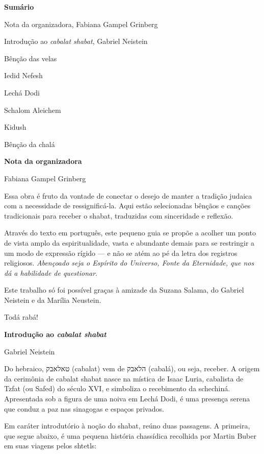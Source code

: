 \textbf{Sumário}

Nota da organizadora, Fabiana Gampel Grinberg

Introdução ao \emph{cabalat shabat}, Gabriel Neistein

Bênção das velas

Iedid Nefesh

Lechá Dodi

Schalom Aleichem

Kidush

Bênção da chalá

\textbf{Nota da organizadora}

Fabiana Gampel Grinberg

Essa obra é fruto da vontade de conectar o desejo de manter a tradição
judaica com a necessidade de ressignificá-la. Aqui estão selecionadas
bênçãos e canções tradicionais para receber o shabat, traduzidas com
sinceridade e reflexão.

Através do texto em português, este pequeno guia se propõe a acolher um
ponto de vista amplo da espiritualidade, vasta e abundante demais para
se restringir a um modo de expressão rígido --- e não se atém ao pé da
letra dos registros religiosos. \emph{Abençoado seja o Espírito do
Universo, Fonte da Eternidade, que nos dá a habilidade de questionar}.

Este trabalho só foi possível graças à amizade da Suzana Salama, do
Gabriel Neistein e da Marília Neustein.

Todá rabá!

\textbf{Introdução ao \emph{cabalat shabat}}

Gabriel Neistein

Do hebraico, טאלאבק (cabalat) vem de הלאבק (cabalá), ou seja, receber. A
origem da cerimônia de cabalat shabat nasce na mística de Isaac Luria,
cabalista de Tzfat (ou Safed) do século XVI, e simboliza o recebimento
da schechiná. Apresentada sob a figura de uma noiva em Lechá Dodi, é uma
presença serena que conduz a paz nas sinagogas e espaços privados.

Em caráter introdutório à noção do shabat, reúno duas passagens. A
primeira, que segue abaixo, é uma pequena história chassídica recolhida
por Martin Buber em suas viagens pelos shtetls:

